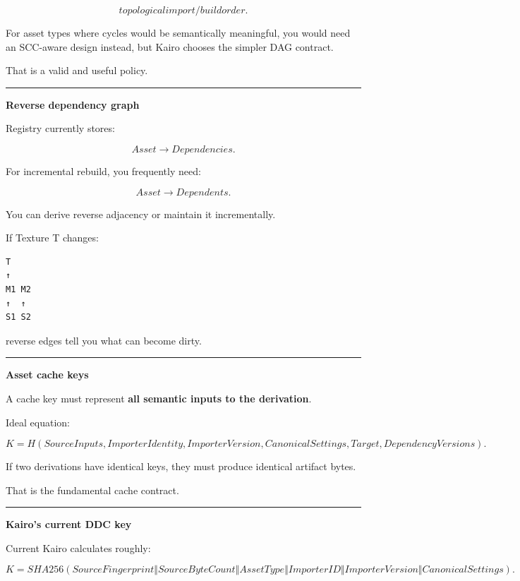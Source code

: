 \[
topological import/build order.
\]

For asset types where cycles would be semantically meaningful, you would need an SCC-aware design instead, but Kairo chooses the simpler DAG contract.

That is a valid and useful policy.

\begin{center}\rule{0.5\linewidth}{0.5pt}\end{center}

\textbf{Reverse dependency graph}

Registry currently stores:

\[
Asset\rightarrow Dependencies.
\]

For incremental rebuild, you frequently need:

\[
Asset\rightarrow Dependents.
\]

You can derive reverse adjacency or maintain it incrementally.

If Texture T changes:

\begin{verbatim}
T
↑
M1 M2
↑  ↑
S1 S2
\end{verbatim}

reverse edges tell you what can become dirty.

\begin{center}\rule{0.5\linewidth}{0.5pt}\end{center}

\textbf{Asset cache keys}

A cache key must represent \textbf{all semantic inputs to the derivation}.

Ideal equation:

\[
\boxed{
K=
H(
SourceInputs,
ImporterIdentity,
ImporterVersion,
CanonicalSettings,
Target,
DependencyVersions
).
}
\]

If two derivations have identical keys, they must produce identical artifact bytes.

That is the fundamental cache contract.

\begin{center}\rule{0.5\linewidth}{0.5pt}\end{center}

\textbf{Kairo's current DDC key}

Current Kairo calculates roughly:

\[
K=
SHA256(
SourceFingerprint
\Vert
SourceByteCount
\Vert
AssetType
\Vert
ImporterID
\Vert
ImporterVersion
\Vert
CanonicalSettings
).
\]

